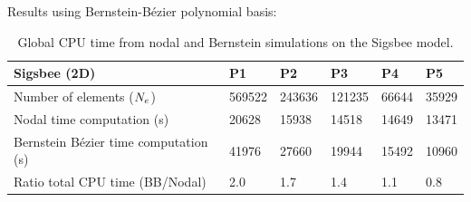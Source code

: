 \begin{frame}[noframenumbering]{Results using Bernstein-Bézier polynomial basis:}
\scriptsize
\vspace{0.5cm}
\begin{table}[H]
    \centering
    \begin{tabular}{|l|l|l|l|l|l|}
    \hline
        \textbf{Sigsbee (2D)} & P1 & P2 & P3 & P4 & P5 \\ \hline
        Number of elements (${N_e}$) & 569522 & 243636 & 121235 & 66644 & 35929 \\ \hline
        Nodal time computation (s) & 20628 & 15938 & 14518 & 14649 & 13471 \\ \hline
        Bernstein Bézier time computation (s) & 41976 & 27660 & 19944 & 15492 & 10960 \\ \hline
        Ratio total CPU time (BB/Nodal) & \cellcolor{\myred!30}2.0 & \cellcolor{\myred!30}1.7 & \cellcolor{\myred!30}1.4 & \cellcolor{\myred!30}1.1 & \cellcolor{\mygreen!30}0.8 \\ \hline
    \end{tabular}
    \caption{Global CPU time from nodal and Bernstein simulations on the Sigsbee model.}
    \label{sigsbee_bb_tab}
\end{table}


\end{frame}

